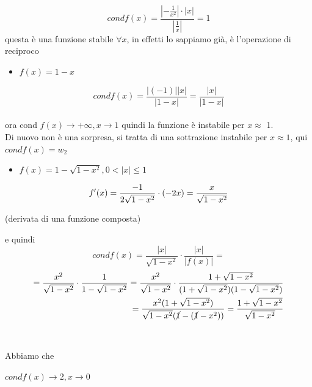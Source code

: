 \documentclass[12pt]{article}
\begin{document}
\begin{equation}
cond f(x)= \frac{\left|-\frac{1}{x^2}\right|\cdot \left|x\right|}{\left|\frac{1}{x}\right|}=1    
\end{equation}
questa è una funzione stabile $\forall x$, in effetti lo sappiamo già, è l'operazione di reciproco
\begin{itemize}
    \item $f(x)=1-x$
\end{itemize}
\begin{equation}
cond f(x)= \frac{\left|(-1)\right|\left|x\right|}{\left|1-x\right|}=\frac{\left|x\right|}{\left|1-x\right|}
\end{equation}
\\ora cond $f(x)\rightarrow +\infty, x\rightarrow 1$ quindi la funzione è instabile per $x\approx$ 1.\\
Di nuovo non è una sorpresa, si tratta di una sottrazione instabile per $x\approx1$, qui $condf(x)=w_2$\\
\begin{itemize}
    \item $f(x)=1-\sqrt{1-x^2}, 0<|x|\leq1$\\
\end{itemize}
\begin{equation}
    f'(x)=\frac{-1}{2\sqrt{1-x^2}}\cdot(-2x)=\frac{x}{\sqrt{1-x^2}}\\ 
\end{equation}
\begin{center}
    (derivata di una funzione composta)
\end{center}
e quindi\\
\begin{equation}
    condf(x)=\frac{|x|}{\sqrt{1-x^2}}\cdot\frac{|x|}{|f(x)|}=
\end{equation}
\begin{equation}
    \begin{split}
        = \frac{x^2}{\sqrt{1-x^2}} \cdot\frac{1}{1-\sqrt{1-x^2}}
        =\frac{x^2}{\sqrt{1-x^2}}\cdot\frac{1+\sqrt{1-x^2}}{(1+\sqrt{1-x^2})(1-\sqrt{1-x^2})}\\
        =\frac{x^2(1+\sqrt{1-x^2})}{\sqrt{1-x^2}(\cancel{1}-(\cancel{1}-x^2))}
        =\frac{1+\sqrt{1-x^2}}{\sqrt{1-x^2}}
    \end{split}
\end{equation}
\\\\Abbiamo che\\ 
\begin{center}
    $condf(x)\rightarrow2, x\rightarrow0$
\end{center}
\end{document}
